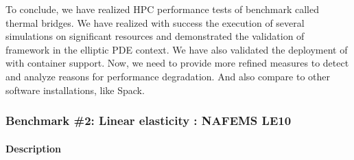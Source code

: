 To conclude, we have realized HPC performance tests of benchmark called thermal
bridges. We have realized with success the execution of several simulations on
significant resources and demonstrated the validation of \Feelpp framework in the
elliptic PDE context. We have also validated the deployment of \Feelpp with
container support. Now, we need to provide more refined measures to detect and
analyze reasons for performance degradation. And also compare to other software
installations, like Spack.



\subsubsection{Benchmark \#2: Linear elasticity : NAFEMS LE10}

\paragraph{Description}

